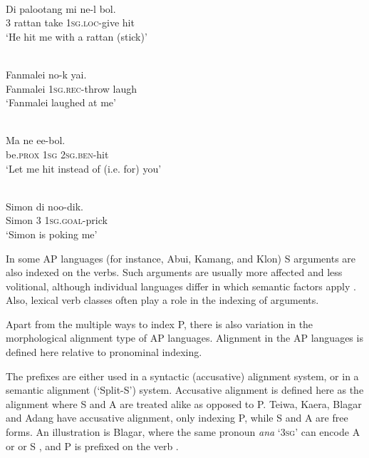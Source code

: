  

\ea%
\label{ex:1:9}
 \\
\gll Di   palootang   mi   ne-l     bol.  \\
 3   rattan     take   \textsc{1sg.loc-}give  hit  \\
\glt  `He hit me with a rattan (stick)'
\z

\textit{}





\ea%
\label{ex:1:10}
 \\
\gll Fanmalei   no-k       yai.  \\
Fanmalei   \textsc{1sg.rec-}throw   laugh   \\
\glt  `Fanmalei  laughed at me'
\z
 


\ea%
\label{ex:1:11}
 \\
\gll Ma     ne   ee-bol. \\
 be.\textsc{prox}   \textsc{1sg}   \textsc{2sg.ben}{}-hit  \\
\glt  `Let me hit instead of (i.e. for) you'
\z
 





\ea%
\label{ex:1:12}
 \\
\gll Simon   di   noo-dik. \\
 Simon   3   \textsc{1sg.goal}{}-prick  \\
\glt `Simon is poking me'
\z
 




In some AP languages (for instance, Abui, Kamang, and Klon) S arguments are also indexed on the verbs. Such arguments are usually more affected and less volitional, although individual languages differ in which semantic factors apply \citep{FeddenEtAlTV,FeddenEtAl2014}. Also, lexical verb classes often play a role in the indexing of arguments. 

Apart from the multiple ways to index P, there is also variation in the morphological alignment type of AP languages. Alignment in the AP languages is defined here relative to pronominal indexing. 

The prefixes are either used in a syntactic (accusative) alignment system, or in a semantic alignment (`Split-S') system. Accusative alignment is defined here as the alignment where S and A are treated alike as opposed to P. Teiwa, Kaera, Blagar and Adang have accusative alignment, only indexing P, while S and A are free forms. An illustration is Blagar, where the same pronoun \textit{{\textglotstop}}\textit{ana} `3\textsc{sg}' can encode A  or or S , and P is prefixed on the verb .



